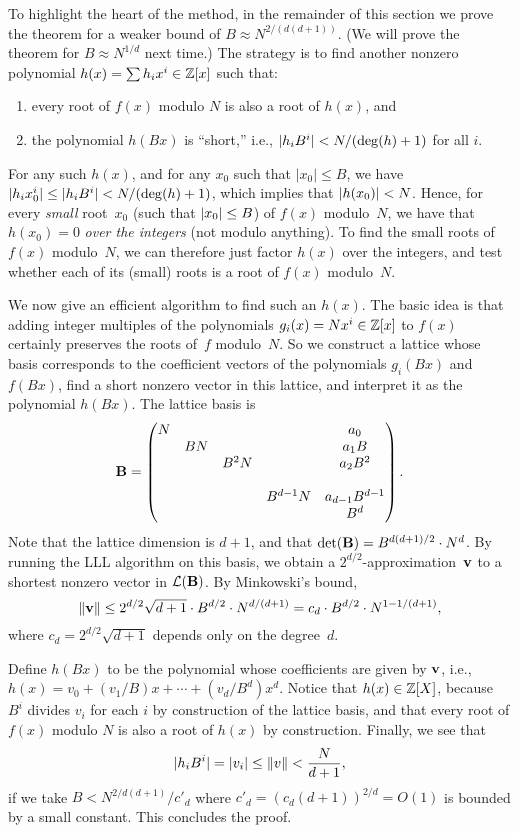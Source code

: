 \documentclass[11pt]{article}
\begin{document}
To highlight the heart of the method, in the remainder of this section
we prove the theorem for a weaker bound of $B \approx N^{2/(d(d+1))}$.
(We will prove the theorem for $B \approx N^{1/d}$ next time.) The
strategy is to find another nonzero polynomial
$h(x) = \sum h_{i} x^{i} \in \mathbb{Z}[x]$ such that:
\begin{enumerate}[itemsep=0pt]
\item every root of $f(x)$ modulo $N$ is also a root of $h(x)$, and
\item the polynomial $h(Bx)$ is ``short,'' i.e.,
  $\lvert h_{i} B^{i}\rvert < N/(\deg(h)+1)$ for all $i$.
\end{enumerate}
For any such $h(x)$, and for any $x_{0}$ such that $|x_0| \leq B$, we
have $\lvert h_i x_0^i\rvert \leq \lvert h_{i} B^{i}\rvert < N/(\deg(h)+1)$, which
implies that $\lvert h(x_0)\rvert < N$. Hence, for every \emph{small}
root~$x_0$ (such that $\lvert x_{0}\rvert \leq B$) of $f(x)$ modulo~$N$, we
have that $h(x_0)=0$ \emph{over the integers} (not modulo anything).
To find the small roots of $f(x)$ modulo~$N$, we can therefore just
factor $h(x)$ over the integers, and test whether each of its (small)
roots is a root of $f(x)$ modulo~$N$.

We now give an efficient algorithm to find such an $h(x)$. The basic
idea is that adding integer multiples of the polynomials
$g_{i}(x) = N x^i \in \mathbb{Z}[x]$ to $f(x)$ certainly preserves the roots
of~$f$ modulo~$N$. So we construct a lattice whose basis corresponds
to the coefficient vectors of the polynomials $g_{i}(Bx)$ and $f(Bx)$,
find a short nonzero vector in this lattice, and interpret it as the
polynomial $h(Bx)$. The lattice basis is
\[ \mathbf{B} =
  \begin{pmatrix}
    N & & & & a_0 \\
      & B N & & & a_1B \\
      & & B^2 N & & a_2B^2   \\
      & & & & \\
      & & & B^{d-1} N & a_{d-1} B^{d-1} \\
      & & & & B^d
  \end{pmatrix}. \]
Note that the lattice dimension is $d+1$, and that
$\det(\mathbf{B}) = B^{d(d+1)/2} \cdot N^d$. By running the LLL algorithm
on this basis, we obtain a $2^{d/2}$-approximation~$\mathbf{v}$ to a
shortest nonzero vector in $\mathcal{L}(\mathbf{B})$. By Minkowski's bound,
\[ \lVert\mathbf{v}\rVert \leq 2^{d/2} \sqrt{d+1} \cdot B^{d/2} \cdot
  N^{d/(d+1)} = c_d \cdot B^{d/2} \cdot N^{1-1/(d+1)},
\]
where $c_d = 2^{d/2} \sqrt{d+1}$ depends only on the degree~$d$.

Define $h(Bx)$ to be the polynomial whose coefficients are given by
$\mathbf{v}$, i.e., $h(x) = v_0 + (v_{1}/B)x + \cdots + (v_{d}/B^{d}) x^d$.
Notice that $h(x) \in \mathbb{Z}[X]$, because $B^i$ divides $v_i$ for each $i$
by construction of the lattice basis, and that every root of $f(x)$
modulo $N$ is also a root of $h(x)$ by construction. Finally, we see
that
\[ \lvert h_{i} B^{i} \rvert = \lvert v_{i}\rvert \leq \lVert v\rVert <
  \frac{N}{d+1}, \] if we take $B < N^{2/d(d+1)} / c'_{d}$ where
$c'_{d} = (c_{d} (d+1))^{2/d} = O(1)$ is bounded by a small constant.
This concludes the proof.



\end{document}
